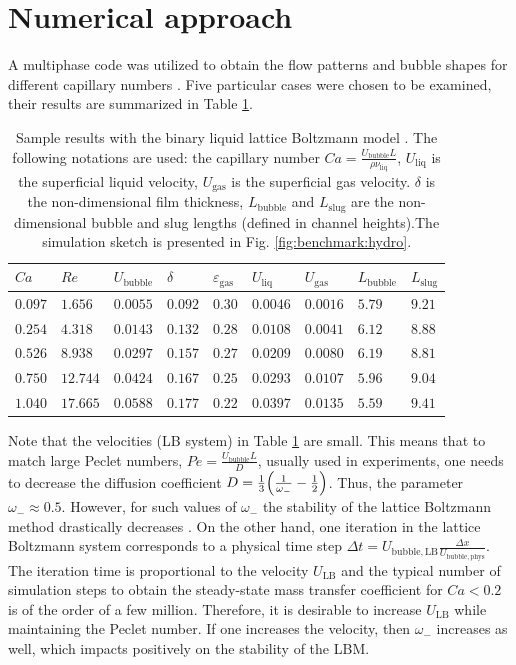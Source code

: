 \documentclass[preprint,12pt]{elsarticle}
\newcommand{\lbubble}{L_{\mathrm{bubble}}}
\newcommand{\lslug}{L_{\mathrm{slug}}}
\newcommand{\ububble}{U_{\mathrm{bubble}}}
\newcommand{\uliq}{U_{\mathrm{liq}}}
\newcommand{\ugas}{U_{\mathrm{gas}}}
\newcommand{\omegaminus}{\omega_{-}}
\newcommand{\holdup}{\varepsilon_{\mathrm{gas}}}
\begin{document}
\section{Numerical approach}
\label{sec:numerics}
A multiphase code was utilized to obtain the flow patterns and bubble shapes for different capillary numbers
\cite{kuzmin-binary2d}. Five particular cases were chosen to be examined, their results are summarized
in Table \ref{table:capillary:cases}. 
\begin{table}[htb!]
\begin{tabularx}{\textwidth}{|X|X|X|X|X|X|X|X|X|}
\hline
$Ca$    &$Re$     &$\ububble$ &$\delta$&$\holdup$
&$\uliq$&$\ugas$&$\lbubble$&$\lslug$\\
\hline
$0.097$ &$1.656$  &$0.0055$ &$0.092$ &$0.30$ &$0.0046$&$0.0016$&$5.79$&$9.21$\\ 
$0.254$ &$4.318$  &$0.0143$ &$0.132$ &$0.28$ &$0.0108$&$0.0041$&$6.12$&$8.88$\\ 
$0.526$ &$8.938$  &$0.0297$ &$0.157$ &$0.27$ &$0.0209$&$0.0080$&$6.19$&$8.81$\\
$0.750$ &$12.744$ &$0.0424$ &$0.167$ &$0.25$ &$0.0293$&$0.0107$&$5.96$&$9.04$\\
$1.040$ &$17.665$ &$0.0588$ &$0.177$ &$0.22$ &$0.0397$&$0.0135$&$5.59$&$9.41$\\
\hline
\end{tabularx}
\caption{Sample results with the binary liquid lattice Boltzmann model \cite{kuzmin-binary2d}. The
following notations are used: the capillary number $Ca=\frac{\ububble L}{\rho \nu_{\mathrm{liq}}}$, $\uliq$ is the superficial liquid velocity, $\ugas$ is the
superficial gas velocity. $\delta$ is the
non-dimensional film thickness, $\lbubble$ and $\lslug$ are the non-dimensional bubble and slug lengths (defined in channel heights).The simulation sketch is presented in Fig.
\ref{fig:benchmark:hydro}. \label{table:capillary:cases}}
\end{table}
Note that the velocities (LB system) in Table \ref{table:capillary:cases} are small. This means that to
match large Peclet numbers, $Pe=\frac{\ububble L}{D}$, usually used in experiments, one needs to decrease the diffusion coefficient
$D=\frac{1}{3}\Bigl(\frac{1}{\omegaminus}-\frac{1}{2}\Bigr)$. Thus, the parameter $\omegaminus\approx 0.5$. However, for such values of 
$\omegaminus$ the stability of the lattice Boltzmann method drastically decreases
\cite{kuzmin-d1q3}. On the other hand, one iteration in the lattice Boltzmann system corresponds
to a physical time step  $\Delta t=U_{\mathrm{bubble,LB}} \frac{\Delta
x}{U_{\mathrm{bubble,phys}}}$. The iteration time is proportional to the velocity $U_{\mathrm{LB}}$
and the typical number of simulation steps to obtain the steady-state mass transfer coefficient for
$Ca<0.2$ is of the order of a few million. Therefore, it is desirable to increase    $U_{\mathrm{LB}}$
while maintaining the Peclet number. If one increases the velocity, then
$\omegaminus$ increases as well, which impacts positively on the stability of the LBM.
 
\end{document}
